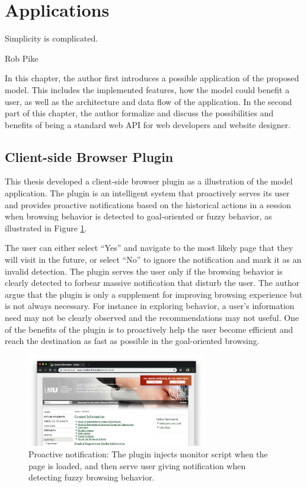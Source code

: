 \section{Applications}
\label{ch:app}

\epigraph{Simplicity is complicated.}{Rob Pike}

In this chapter, the author first introduces a possible application of the proposed model.
This includes the implemented features, how the model could benefit a user, 
as well as the architecture and data flow of the application.
In the second part of this chapter, the author formalize and discuss 
the possibilities and benefits of being a standard web API for web developers 
and website designer.

\subsection{Client-side Browser Plugin}
\label{sec:plugin}

This thesis developed a client-side browser plugin as a illustration of the model application.
The plugin is an intelligent system that proactively serves its user
and provides proactive notifications based on the historical actions in a session
when browsing behavior is detected to goal-oriented or fuzzy behavior, 
as illustrated in Figure \ref{fig:proactive-noti}.

The user can either select ``Yes'' and navigate to the most likely page that they 
will visit in the future, or select ``No'' to ignore the notification and mark it as an invalid detection.
The plugin serves the user only if the browsing behavior is clearly detected 
to forbear massive notification that disturb the user. 
The author argue that the plugin is only a supplement for improving
browsing experience but is not always necessary. For instance in exploring behavior, 
a user's information need may not be clearly observed and the recommendations may not 
useful. 
One of the benefits of the plugin is to proactively help the user become efficient
and reach the destination as fast as possible in the goal-oriented browsing.

\begin{figure}[H]
    \centering
    \includegraphics[width=0.7\textwidth]{figures/proactive-noti}
    \caption{Proactive notification:
    The plugin injects monitor script when the page is loaded, and then serve user giving
    notification when detecting fuzzy browsing behavior.}
    \label{fig:proactive-noti}
\end{figure}

